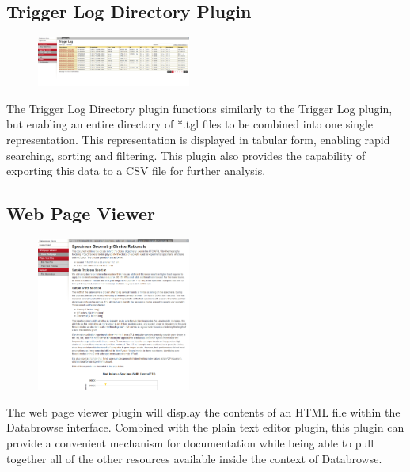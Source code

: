 \documentclass[10pt]{article}
\begin{document}
\begingroup
\setlength\intextsep{0pt}
\subsection{Trigger Log Directory Plugin}
\begin{figure}
		\includegraphics[width=0.45\textwidth]{Trigger_Log_Directory_Plugin.png}
\end{figure}
The Trigger Log Directory plugin functions similarly to the Trigger Log plugin, but enabling an entire directory of *.tgl files to be combined into one single representation.  This representation is displayed in tabular form, enabling rapid searching, sorting and filtering.  This plugin also provides the capability of exporting this data to a CSV file for further analysis.

\endgroup


\clearpage
\begingroup
\setlength\intextsep{0pt}
\subsection{Web Page Viewer}
\begin{figure}
		\includegraphics[width=0.45\textwidth]{WebPage_Viewer.png}
\end{figure}
The web page viewer plugin will display the contents of an HTML file within the Databrowse interface.  Combined with the plain text editor plugin, this plugin can provide a convenient mechanism for documentation while being able to pull together all of the other resources available inside the context of Databrowse.

\endgroup
\end{document}
